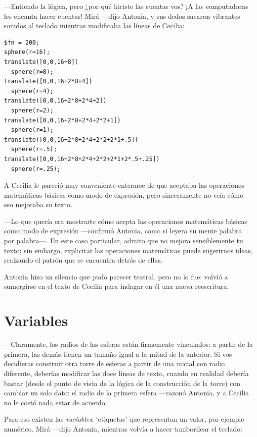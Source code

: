  ---Entiendo la lógica, pero ¿por qué hiciste las cuentas vos? ¡A las
 computadoras les encanta hacer cuentas! Mirá ---dijo Antonia, y sus
 dedos sacaron vibrantes sonidos al teclado mientras modificaba las
 líneas de Cecilia:
 
\begin{lstlisting}
$fn = 200;      
sphere(r=16);
translate([0,0,16+8])
  sphere(r=8);
translate([0,0,16+2*8+4])
  sphere(r=4);
translate([0,0,16+2*8+2*4+2])
  sphere(r=2);
translate([0,0,16+2*8+2*4+2*2+1])
  sphere(r=1);
translate([0,0,16+2*8+2*4+2*2+2*1+.5])
  sphere(r=.5);
translate([0,0,16+2*8+2*4+2*2+2*1+2*.5+.25])
  sphere(r=.25);      
\end{lstlisting}%


A Cecilia le pareció muy conveniente enterarse de que \openscad{}
aceptaba las operaciones matemáticas básicas como modo de expresión,
pero sinceramente no veía cómo eso mejoraba su texto.

---Lo que quería era mostrarte cómo \openscad{} acepta las operaciones
matemáticas básicas como modo de expresión ---confirmó Antonia, como
si leyera su mente palabra por palabra---. En este caso particular,
admito que no mejora sensiblemente tu texto; sin embargo, explicitar
las operaciones matemáticas puede sugerirnos ideas, realzando el
patrón que se encuentra detrás de ellas.

Antonia hizo un silencio que pudo parecer teatral, pero no lo fue:
volvió a sumergirse en el texto de Cecilia para indagar en él una
nueva reescritura.

 \section{Variables}

 ---Claramente, los radios de las esferas están firmemente vinculados:
 a partir de la primera, las demás tienen un tamaño igual a la mitad
 de la anterior. Si vos decidieras construir otra torre de esferas a
 partir de una inicial con radio diferente, deberías modificar las
 doce líneas de texto, cuando en realidad debería bastar (desde el
 punto de vista de la lógica de la construcción de la torre) con
 cambiar un solo dato: el radio de la primera esfera ---razonó
 Antonia, y a Cecilia no le costó nada estar de acuerdo.

 \guillemotright Para eso existen las \emph{variables}: `etiquetas'
 que representan un valor, por ejemplo numérico. Mirá ---dijo Antonia,
 mientras volvía a hacer tamborilear el teclado:


